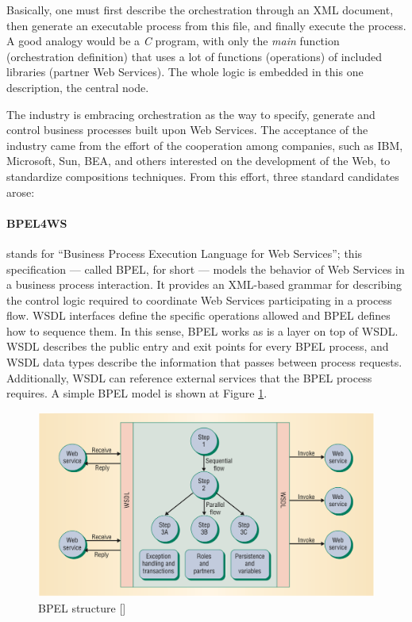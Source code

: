 Basically, one must first describe the orchestration through an XML document, then generate an executable process from this file, and finally execute the process. A good analogy would be a \emph{C} program, with only the \emph{main} function (orchestration definition) that uses a lot of functions (operations) of included libraries (partner Web Services). The whole logic is embedded in this one description, the central node. 

The industry is embracing orchestration as the way to specify, generate and control business processes built upon Web Services. The acceptance of the industry came from the effort of the cooperation among companies, such as IBM, Microsoft, Sun, BEA, and others interested on the development of the Web, to standardize compositions techniques. From this effort, three standard candidates arose:

\paragraph{BPEL4WS} 
stands for ``Business Process Execution Language for Web Services''; this specification — called BPEL, for short — models the behavior of Web Services in a business process interaction. It provides an XML-based grammar for describing the control logic required to coordinate Web Services participating in a process flow. WSDL interfaces define the specific operations allowed and BPEL defines how to sequence them. In this sense, BPEL works as is a layer on top of WSDL. WSDL describes the public entry and exit points for every BPEL process, and WSDL data types describe the information that passes between process requests. Additionally, WSDL can reference external services that the BPEL process requires. A simple BPEL model is shown at Figure \ref{BPELstructure}.

\begin{figure}[h]
  \centering
  \includegraphics[width=\textwidth]{images/BPELstructure}
  \caption{BPEL structure [\citet{WSOC}]}
  \label{BPELstructure}
\end{figure}

